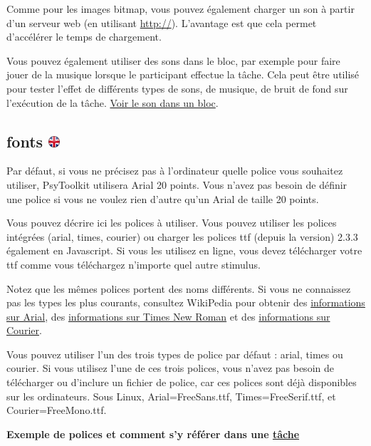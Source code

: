 \documentclass[
]{book}
\begin{document}
Comme pour les images bitmap, vous pouvez également charger un son à partir d'un serveur web (en utilisant \url{http://}). L'avantage est que cela permet d'accélérer le temps de chargement.

Vous pouvez également utiliser des sons dans le bloc, par exemple pour faire jouer de la musique lorsque le participant effectue la tâche. Cela peut être utilisé pour tester l'effet de différents types de sons, de musique, de bruit de fond sur l'exécution de la tâche. \protect\hyperlink{block-sound}{Voir le son dans un bloc}.

\hypertarget{fonts}{%
\subsection[fonts ]{\texorpdfstring{fonts \href{https://www.psytoolkit.org/doc3.2.0/syntax.html\#fonts}{\protect\includegraphics{img/ukflag.png}}}{fonts }}\label{fonts}}

Par défaut, si vous ne précisez pas à l'ordinateur quelle police vous souhaitez utiliser, PsyToolkit utilisera Arial 20 points. Vous n'avez pas besoin de définir une police si vous ne voulez rien d'autre qu'un Arial de taille 20 points.

Vous pouvez décrire ici les polices à utiliser. Vous pouvez utiliser les polices intégrées (arial, times, courier) ou charger les polices ttf (depuis la version) 2.3.3 également en Javascript. Si vous les utilisez en ligne, vous devez télécharger votre ttf comme vous téléchargez n'importe quel autre stimulus.

Notez que les mêmes polices portent des noms différents. Si vous ne connaissez pas les types les plus courants, consultez WikiPedia pour obtenir des \href{https://en.wikipedia.org/wiki/Arial}{informations sur Arial}, des \href{https://en.wikipedia.org/wiki/Times_New_Roman}{informations sur Times New Roman} et des \href{https://en.wikipedia.org/wiki/Courier_\%28typeface\%29}{informations sur Courier}.

Vous pouvez utiliser l'un des trois types de police par défaut : arial, times ou courier. Si vous utilisez l'une de ces trois polices, vous n'avez pas besoin de télécharger ou d'inclure un fichier de police, car ces polices sont déjà disponibles sur les ordinateurs. Sous Linux, Arial=FreeSans.ttf, Times=FreeSerif.ttf, et Courier=FreeMono.ttf.

\textbf{Exemple de polices et comment s'y référer dans une \protect\hyperlink{task}{tâche}}
\end{document}
